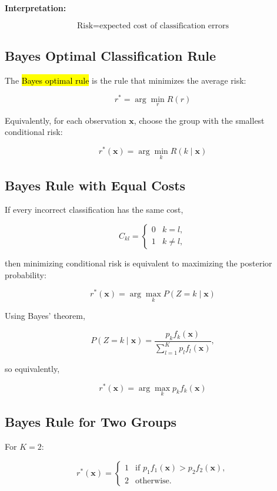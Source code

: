 \documentclass[a4paper,11pt]{article}
\begin{document}
\textbf{Interpretation:}

$$
\boxed{
\text{Risk}=\text{expected cost of classification errors}
}
$$

\subsection{Bayes Optimal Classification Rule}

The \hl{Bayes optimal rule} is the rule that minimizes the average risk:

$$
\boxed{
r^*=\arg\min_r R(r)
}
$$

Equivalently, for each observation $\mathbf{x}$, choose the group with the
smallest conditional risk:

$$
\boxed{
r^*(\mathbf{x})
=
\arg\min_k R(k\mid\mathbf{x})
}
$$

\subsection{Bayes Rule with Equal Costs}

If every incorrect classification has the same cost,

$$
C_{kl}=
\begin{cases}
0 & k=l,\\
1 & k\neq l,
\end{cases}
$$

then minimizing conditional risk is equivalent to maximizing the posterior
probability:

$$
\boxed{
r^*(\mathbf{x})
=
\arg\max_k P(Z=k\mid\mathbf{x})
}
$$

Using Bayes' theorem,

$$
P(Z=k\mid\mathbf{x})
=
\frac{p_kf_k(\mathbf{x})}
{\displaystyle\sum_{l=1}^Kp_lf_l(\mathbf{x})},
$$

so equivalently,

$$
\boxed{
r^*(\mathbf{x})
=
\arg\max_k p_kf_k(\mathbf{x})
}
$$

\subsection{Bayes Rule for Two Groups}

For $K=2$:

$$
r^*(\mathbf{x})=
\begin{cases}
1 & \text{if }p_1f_1(\mathbf{x})>p_2f_2(\mathbf{x}),\\
2 & \text{otherwise.}
\end{cases}
$$
\end{document}
